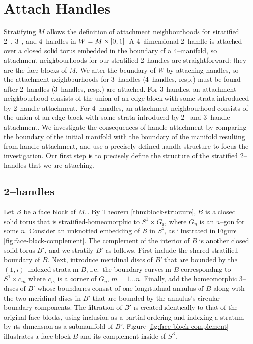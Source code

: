 \section{Attach Handles}

Stratifying $M$ allows the definition of attachment neighbourhoods for stratified 2--, 3--, and 4--handles in $W=M\times[0,1]$.
A 4--dimensional 2--handle is attached over a closed solid torus embedded in the boundary of a 4--manifold, so attachment neighbourhoods for our stratified 2--handles are straightforward: they are the face blocks of $M$.
We alter the boundary of $W$ by attaching handles, so the attachment neighbourhoods for 3--handles (4--handles, resp.) must be found after 2--handles (3--handles, resp.) are attached.
For 3--handles, an attachment neighbourhood consists of the union of an edge block with some strata introduced by 2--handle attachment.
For 4--handles, an attachment neighbourhood consists of the union of an edge block with some strata introduced by 2-- and 3--handle attachment.
We investigate the consequences of handle attachment by comparing the boundary of the initial manifold with the boundary of the manifold resulting from handle attachment, and use a precisely defined handle structure to focus the investigation.
Our first step is to precisely define the structure of the stratified 2--handles that we are attaching.

\subsection{2--handles}

Let $B$ be a face block of $M_1$.
By Theorem \ref{thm:block-structure}, $B$ is a closed solid torus that is stratified-homeomorphic to $S^1\times G_n$, where $G_n$ is an $n$--gon for some $n$.
Consider an unknotted embedding of $B$ in $S^3$, as illustrated in Figure \ref{fig:face-block-complement}.
The complement of the interior of $B$ is another closed solid torus $B'$, and we stratify $B'$ as follows.
First include the shared stratified boundary of $B$.
Next, introduce meridinal discs of $B'$ that are bounded by the $(1,i)$--indexed strata in $B$, i.e.\ the boundary curves in $B$ corresponding to $S^1\times c_m$ where $c_m$ is a corner of $G_n$, $m=1\dots n$.
Finally, add the homeomorphic 3--discs of $B'$ whose boundaries consist of one longitudinal annulus of $B$ along with the two meridinal discs in $B'$ that are bounded by the annulus's circular boundary components.
The filtration of $B'$ is created identically to that of the original face blocks, using inclusion as a partial ordering and indexing a stratum by its dimension as a submanifold of $B'$.
Figure \ref{fig:face-block-complement} illustrates a face block $B$ and its complement inside of $S^3$.

